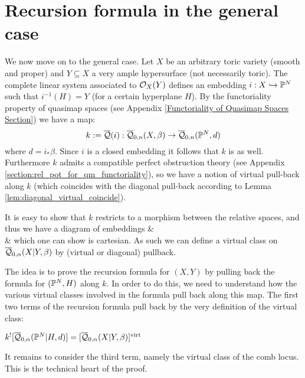 \section{Recursion formula in the general case}\label{Section recursion formula in general case}
We now move on to the general case. Let $X$ be an arbitrary toric variety (smooth and proper) and $Y \subseteq X$ a very ample hypersurface (not necessarily toric). The complete linear system associated to $\mathcal{O}_X(Y)$ defines an embedding $i : X \hookrightarrow \mathbb P^N$ such that $i^{-1}(H) = Y$ (for a certain hyperplane $H$). By the functoriality property of quasimap spaces (see Appendix \ref{Functoriality of Quasimap Spaces Section}) we have a map:
\begin{equation*} k := \overline{\mathcal{Q}}(i) : \overline{\mathcal Q}_{0,n}(X,\beta) \rightarrow \overline{\mathcal Q}_{0,n}(\mathbb P^N,d) \end{equation*}
where $d=i_*\beta$. Since $i$ is a closed embedding it follows that $k$ is as well. Furthermore $k$ admits a compatible perfect obstruction theory (see Appendix \ref{section:rel_pot_for_qm_functoriality}), so we have a notion of virtual pull-back along $k$ (which coincides with the diagonal pull-back according to Lemma \ref{lem:diagonal_virtual_coincide}).

It is easy to show that $k$ restricts to a morphism between the relative spaces, and thus we have a diagram of embeddings
\bcd
{} \ar[d, "f", hook] \ar[r, "g", hook]  &  \ar[d, "j", hook] \\
  \ar[r, "k", hook] & 
\ecd
which one can show is cartesian. As such we can define a virtual class on $\overline{\mathcal Q}_{0,\alpha}(X|Y,\beta)$ by (virtual or diagonal) pullback.

The idea is to prove the recursion formula for $(X,Y)$ by pulling back the formula for $(\mathbb P^N,H)$ along $k$. In order to do this, we need to understand how the various virtual classes involved in the formula pull back along this map. The first two terms of the recursion formula pull back by the very definition of the virtual class:
\begin{lemma} \label{Relative spaces pull back} $k^! [\overline{\mathcal Q}_{0,\alpha}(\mathbb P^N|H,d)] = [\overline{\mathcal Q}_{0,\alpha}(X|Y,\beta)]^{\operatorname{virt}}$ \end{lemma}
It remains to consider the third term, namely the virtual class of the comb locus. This is the technical heart of the proof.

